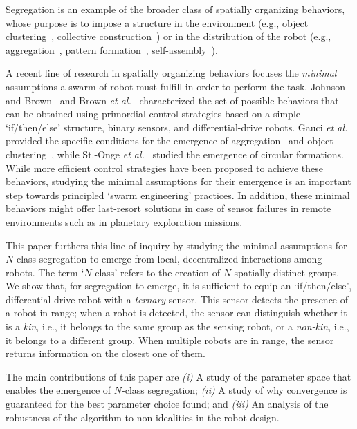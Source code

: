 \documentclass[conference]{IEEEtran}
\begin{document}
Segregation is an example of the broader class of spatially organizing
behaviors, whose purpose is to impose a structure in the environment (e.g.,
object clustering~\cite{gauci_clustering_2014}, collective
construction~\cite{Bolger2010}) or in the distribution of the robot (e.g.,
aggregation~\cite{shlyakhov_survey_2017}, pattern
formation~\cite{Pinciroli:DARS2016}, self-assembly~\cite{gross2008self}).

A recent line of research in spatially organizing behaviors focuses the
\emph{minimal} assumptions a swarm of robot must fulfill in order to perform the
task. Johnson and Brown~\cite{johnson_evolving_2016} and Brown \emph{et
  al.}~\cite{brown_discovery_2018} characterized the set of possible behaviors
that can be obtained using primordial control strategies based on a simple
`if/then/else' structure, binary sensors, and differential-drive robots. Gauci
\emph{et al.} provided the specific conditions for the emergence of
aggregation~\cite{gauci_evolving_2014} and object
clustering~\cite{gauci_clustering_2014}, while St.-Onge \emph{et
  al.}~\cite{StOnge:IROS2018} studied the emergence of circular
formations. While more efficient control strategies have been proposed to
achieve these behaviors, studying the minimal assumptions for their emergence is
an important step towards principled `swarm engineering' practices. In addition,
these minimal behaviors might offer last-resort solutions in case of sensor
failures in remote environments such as in planetary exploration missions.

This paper furthers this line of inquiry by studying the minimal assumptions for
$N$-class segregation to emerge from local, decentralized interactions among
robots. The term `$N$-class' refers to the creation of $N$ spatially distinct
groups. We show that, for segregation to emerge, it is sufficient to equip an
`if/then/else', differential drive robot with a \emph{ternary} sensor. This
sensor detects the presence of a robot in range; when a robot is detected, the
sensor can distinguish whether it is a \emph{kin}, i.e., it belongs to the same
group as the sensing robot, or a \emph{non-kin}, i.e., it belongs to a different
group. When multiple robots are in range, the sensor returns information on the
closest one of them.

The main contributions of this paper are \emph{(i)} A study of the parameter
space that enables the emergence of $N$-class segregation; \emph{(ii)} A study
of why convergence is guaranteed for the best parameter choice found; and
\emph{(iii)} An analysis of the robustness of the algorithm to non-idealities in
the robot design.
\end{document}
